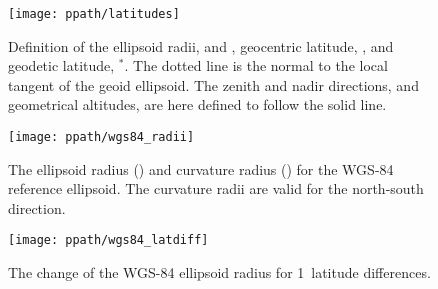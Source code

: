 \begin{figure}[!p]
 \begin{center}
  \begin{minipage}[c]{0.65\textwidth}
   \begin{center}
    \texttt{[image: ppath/latitudes]}
   \end{center}
  \end{minipage}%
  \begin{minipage}[c]{0.35\textwidth}
   \caption{Definition of the ellipsoid radii,  and , 
     geocentric latitude, \Lat, and geodetic latitude, \Lat$^*$. The
     dotted line is the normal to the local tangent of the geoid
     ellipsoid. The zenith and nadir directions, and geometrical
     altitudes, are here defined to follow the solid line.}
   \label{fig:ppath:lats}
  \end{minipage}
 \end{center}
\end{figure}   

\begin{figure}[!p]
 \begin{minipage}[c]{0.65\textwidth}
 \texttt{[image: ppath/wgs84\_radii]}
 \end{minipage}%
 \begin{minipage}[c]{0.35\textwidth}
  \caption{The ellipsoid radius (\aRds{\odot}) and curvature radius ()
    for the
    WGS-84 reference ellipsoid. The curvature radii are valid for the
    north-south direction.}
  \label{fig:ppath:wgs84radii}
 \end{minipage}%
\end{figure}   
        
\begin{figure}[!p]
 \begin{minipage}[c]{0.65\textwidth}
 \texttt{[image: ppath/wgs84\_latdiff]}
 \end{minipage}%
 \begin{minipage}[c]{0.35\textwidth}
  \caption{The change of the WGS-84 ellipsoid radius for  1\degree\ 
            latitude differences.}
  \label{fig:ppath:latdiff}
 \end{minipage}%
\end{figure}   



\label{sec:ppath:geolat}

